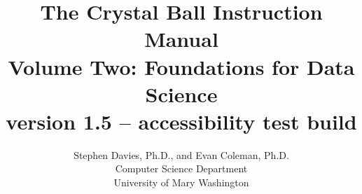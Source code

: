 \documentclass[11pt]{book}   %
\begin{document}
\title{{\huge The Crystal Ball Instruction Manual}\\{\large Volume Two:
Foundations for Data Science}\\
{\small version 1.5 -- accessibility test build}}
\author{Stephen Davies, Ph.D., and Evan Coleman, Ph.D.\\Computer Science Department\\University of Mary Washington}
\date{}
\maketitle


\frontmatter

\renewcommand{\contentsname}{Contents}
\setcounter{tocdepth}{0}
\tableofcontents

\mainmatter

           
          
   
             
      
      
           
           
          
      
          
    
      
            
       
   
   
            
      
             
             
             
             
            
            
 
 
    
         

\backmatter
\printindex

\end{document}
